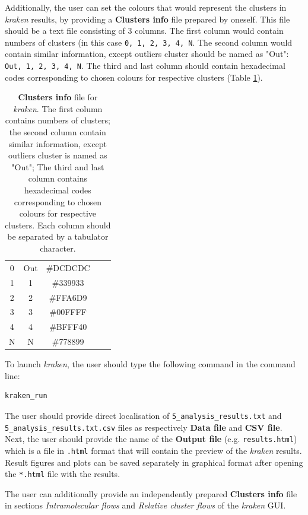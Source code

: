 \documentclass[9pt,tutorial]{livecoms}
\begin{document}
Additionally, the user can set the colours that would represent the clusters in \textit{kraken} results, by providing a \textbf{Clusters info} file prepared by oneself. This file should be a text file consisting of 3 columns. The first column would contain numbers of clusters (in this case \texttt{0, 1, 2, 3, 4, N}. The second column would contain similar information, except outliers cluster should be named as "Out": \texttt{Out, 1, 2, 3, 4, N}. The third and last column should contain hexadecimal codes corresponding to chosen colours for respective clusters ({Table \ref{table1}}).

\begin{table}[hbt!]
\centering
\begin{tabular}{ c c c c c }
 0 & Out & \#DCDCDC \\ 
 1 & 1 & \#339933 \\  
 2 & 2 & \#FFA6D9 \\
 3 & 3 & \#00FFFF \\
 4 & 4 & \#BFFF40 \\
 N & N & \#778899
 \end{tabular}
 \caption{\textbf{Clusters info} file for \textit{kraken}. The first column contains numbers of clusters; the second column contain similar information, except outliers cluster is named as "Out"; The third and last column contains hexadecimal codes corresponding to chosen colours for respective clusters. Each column should be separated by a tabulator character.}
\label{table1}
\end{table}

To launch \textit{kraken}, the user should type the following command in the command line:
\begin{lstlisting}
kraken_run 
\end{lstlisting}

The user should provide direct localisation of \newline \texttt{5\_analysis\_results.txt} and \texttt{5\_analysis\_results.txt.csv} files as respectively \textbf{Data file} and \textbf{CSV file}. Next, the user should provide the name of the \textbf{Output file} (e.g. \texttt{results.html}) which is a  file in \texttt{.html} format that will contain the preview of the \textit{kraken} results. Result figures and plots can be saved separately in graphical format after opening the \texttt{*.html} file with the results. 

The user can additionally provide an independently prepared \textbf{Clusters info} file in sections \textit{Intramolecular flows} and \textit{Relative cluster flows} of the \textit{kraken} GUI. 
\end{document}
